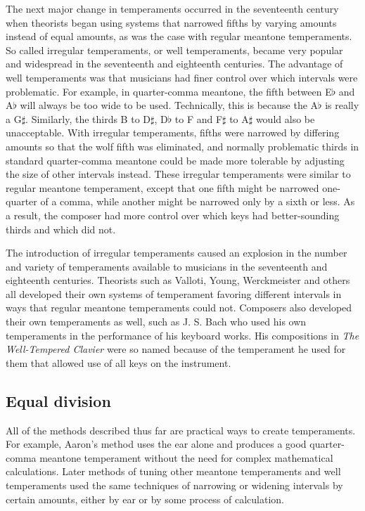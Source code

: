 The next major change in temperaments occurred in the seventeenth century when theorists began using
systems that narrowed fifths by varying amounts instead of equal amounts, as was the case with
regular meantone temperaments.  So called irregular temperaments, or well temperaments, became very
popular and widespread in the seventeenth and eighteenth centuries.  The advantage of well
temperaments was that musicians had finer control over which intervals were problematic.  For
example, in quarter-comma meantone, the fifth between E$\flat$ and A$\flat$ will always be too wide
to be used.  Technically, this is because the A$\flat$ is really a G$\sharp$. \autocite[35]{RD:1}
Similarly, the thirds B to D$\sharp$, D$\flat$ to F and F$\sharp$ to A$\sharp$ would also be
unacceptable.  With irregular temperaments, fifths were narrowed by differing amounts so that the
wolf fifth was eliminated, and normally problematic thirds in standard quarter-comma meantone could
be made more tolerable by adjusting the size of other intervals instead. These irregular
temperaments were similar to regular meantone temperament, except that one fifth might be narrowed
one-quarter of a comma, while another might be narrowed only by a sixth or less.  As a result, the
composer had more control over which keys had better-sounding thirds and which did not.

The introduction of irregular temperaments caused an explosion in the number and variety of
temperaments available to musicians in the seventeenth and eighteenth centuries. Theorists such as
Valloti, Young, Werckmeister and others all developed their own systems of temperament favoring
different intervals in ways that regular meantone temperaments could not.  Composers also developed
their own temperaments as well, such as J. S. Bach who used his own temperaments in the performance
of his keyboard works.  His compositions in \textit{The Well-Tempered Clavier} were so named because
of the temperament he used for them that allowed use of all keys on the instrument.

\subsection{Equal division}

All of the methods described thus far are practical ways to create temperaments.
For example, Aaron's method uses the ear alone and produces a good quarter-comma 
meantone temperament without the need for complex mathematical calculations. Later methods
of tuning other meantone temperaments and well temperaments used the same techniques of
narrowing or widening intervals by certain amounts, either by ear or by some process of
calculation.


